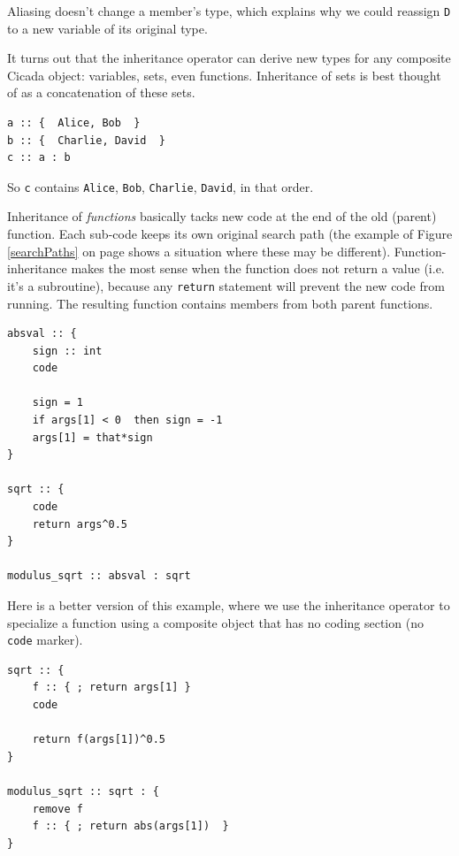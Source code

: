 \documentclass{article}
\newenvironment{code}{
       \begin{list}{}{
               \setlength{\leftmargin}{.4in}
               \setlength{\rightmargin}{0in}
               \setlength{\topsep}{.2in}
       }
       \small
       \item[] }
       { \end{list}   }
\begin{document}
\noindent Aliasing doesn't change a member's type, which explains why we could reassign \verb#D# to a new variable of its original type.

It turns out that the inheritance operator can derive new types for any composite Cicada object:  variables, sets, even functions.  Inheritance of sets is best thought of as a concatenation of these sets.

\begin{code} \begin{verbatim}
a :: {  Alice, Bob  }
b :: {  Charlie, David  }
c :: a : b
\end{verbatim} \end{code}

\noindent So \texttt{c} contains \texttt{Alice}, \texttt{Bob}, \texttt{Charlie}, \texttt{David}, in that order.

Inheritance of \emph{functions} basically tacks new code at the end of the old (parent) function.  Each sub-code keeps its own original search path (the example of Figure \ref{searchPaths} on page \pageref{searchPaths} shows a situation where these may be different).  Function-inheritance makes the most sense when the function does not return a value (i.e. it's a subroutine), because any \verb#return# statement will prevent the new code from running.  The resulting function contains members from both parent functions.

\begin{code} \begin{verbatim}
absval :: {
    sign :: int
    code
    
    sign = 1
    if args[1] < 0  then sign = -1
    args[1] = that*sign
}

sqrt :: {
    code
    return args^0.5
}

modulus_sqrt :: absval : sqrt
\end{verbatim} \end{code}

Here is a better version of this example, where we use the inheritance operator to specialize a function using a composite object that has no coding section (no \verb#code# marker).

\begin{code} \begin{verbatim}
sqrt :: {
    f :: { ; return args[1] }
    code

    return f(args[1])^0.5
}

modulus_sqrt :: sqrt : {
    remove f
    f :: { ; return abs(args[1])  }
}
\end{verbatim} \end{code}
\end{document}
